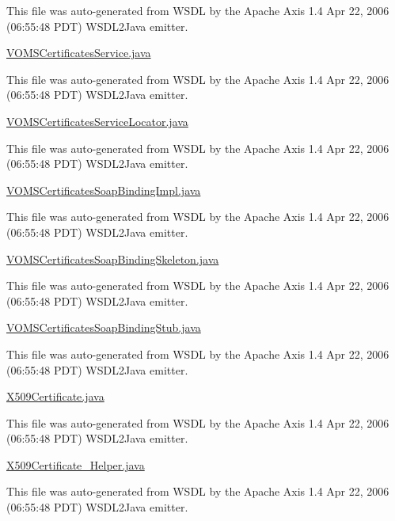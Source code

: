 This file was auto-\/generated from WSDL by the Apache Axis 1.4 Apr 22, 2006 (06:55:48 PDT) WSDL2Java emitter.

\hyperlink{VOMSCertificatesService_8java}{VOMSCertificatesService.java}

This file was auto-\/generated from WSDL by the Apache Axis 1.4 Apr 22, 2006 (06:55:48 PDT) WSDL2Java emitter.

\hyperlink{VOMSCertificatesServiceLocator_8java}{VOMSCertificatesServiceLocator.java}

This file was auto-\/generated from WSDL by the Apache Axis 1.4 Apr 22, 2006 (06:55:48 PDT) WSDL2Java emitter.

\hyperlink{VOMSCertificatesSoapBindingImpl_8java}{VOMSCertificatesSoapBindingImpl.java}

This file was auto-\/generated from WSDL by the Apache Axis 1.4 Apr 22, 2006 (06:55:48 PDT) WSDL2Java emitter.

\hyperlink{VOMSCertificatesSoapBindingSkeleton_8java}{VOMSCertificatesSoapBindingSkeleton.java}

This file was auto-\/generated from WSDL by the Apache Axis 1.4 Apr 22, 2006 (06:55:48 PDT) WSDL2Java emitter.

\hyperlink{VOMSCertificatesSoapBindingStub_8java}{VOMSCertificatesSoapBindingStub.java}

This file was auto-\/generated from WSDL by the Apache Axis 1.4 Apr 22, 2006 (06:55:48 PDT) WSDL2Java emitter.

\hyperlink{X509Certificate_8java}{X509Certificate.java}

This file was auto-\/generated from WSDL by the Apache Axis 1.4 Apr 22, 2006 (06:55:48 PDT) WSDL2Java emitter.

\hyperlink{X509Certificate__Helper_8java}{X509Certificate\_\-Helper.java}

This file was auto-\/generated from WSDL by the Apache Axis 1.4 Apr 22, 2006 (06:55:48 PDT) WSDL2Java emitter. 